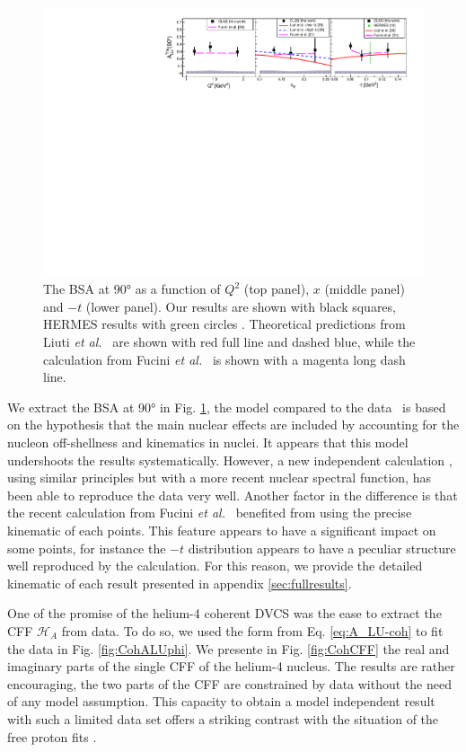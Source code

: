\documentclass[aps,prc,preprint,superscriptaddress]{revtex4}
\begin{document}
\begin{figure}[tbp]
\center
\includegraphics[width=17cm]{fig3/Coherent_ALU_phi_90.pdf}
\caption{The BSA at 90° as a function of $Q^2$ (top panel), $x$ (middle panel) and $-t$ (lower panel).
	Our results are shown with black squares, HERMES results 
	with green circles \cite{Airapetian:2009cga}. Theoretical predictions 
	from Liuti {\it et al.}~\cite{Liuti:2005gi,GonzalezHernandez:2012jv} are shown 
	with red full line and dashed blue, while the calculation from Fucini 
	{\it et al.}~\cite{Fucini:2018gso} is shown with a magenta long dash line.}
\label{fig:CohALU90}
\end{figure}

We extract the BSA at 90° in Fig. \ref{fig:CohALU90}, the model compared to the 
data~\cite{Liuti:2005gi} is based on the hypothesis that the main nuclear effects are 
included by accounting for the nucleon off-shellness and kinematics in nuclei. It 
appears that this model undershoots the results systematically. However, a new independent 
calculation \cite{Fucini:2018gso}, using similar principles but with a more recent nuclear spectral 
function, has been able to reproduce the data very well. Another factor in the difference is that the
recent calculation from Fucini {\it et al.}~\cite{Fucini:2018gso} benefited from using the precise 
kinematic of each points. This feature appears to have a significant impact on some points, for 
instance the $-t$ distribution appears to have a peculiar structure well reproduced by the 
calculation. For this reason, we provide the detailed kinematic of each result presented in
appendix \ref{sec:fullresults}.

One of the promise of the helium-4 coherent DVCS was the ease to extract the CFF $\mathcal{H}_A$ from
data. To do so, we used the form from Eq. \ref{eq:A_LU-coh} to fit the data in Fig. 
\ref{fig:CohALUphi}. We presente in Fig. \ref{fig:CohCFF} the real and imaginary parts 
of the single CFF of the helium-4 nucleus. The results are rather encouraging, the two parts
of the CFF are constrained by data without the need of any model assumption. This capacity to obtain a
model independent result with such a limited data set offers a striking contrast with the
situation of the free proton fits \cite{Dupre:2016mai,Dupre:2017hfs}.
\end{document}
